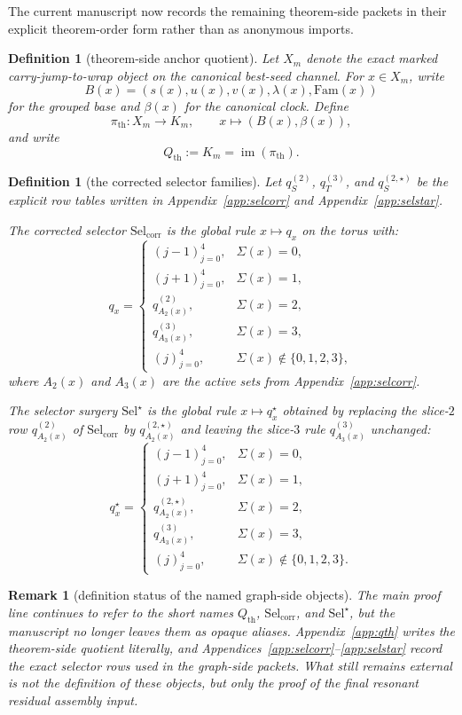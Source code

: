 \documentclass[11pt]{article}
\newtheorem{remark}[theorem]{Remark}
\newtheorem{definition}[theorem]{Definition}
\newcommand{\SelCorr}{\mathrm{Sel}_{\mathrm{corr}}}
\newcommand{\SelStar}{\mathrm{Sel}^{\star}}
\begin{document}
The current manuscript now records the remaining theorem-side packets in their
explicit theorem-order form rather than as anonymous imports.

\begin{definition}[theorem-side anchor quotient]
Let \(X_m\) denote the exact marked carry-jump-to-wrap object on the canonical
best-seed channel.
For \(x\in X_m\), write
\[
B(x)=(s(x),u(x),v(x),\lambda(x),\mathrm{Fam}(x))
\]
for the grouped base and \(\beta(x)\) for the canonical clock.
Define
\[
\pi_{\mathrm{th}}:X_m\to K_m,\qquad x\mapsto(B(x),\beta(x)),
\]
and write
\[
Q_{\mathrm{th}}:=K_m=\operatorname{im}(\pi_{\mathrm{th}}).
\]
\end{definition}

\begin{definition}[the corrected selector families]
Let \(q^{(2)}_S\), \(q^{(3)}_T\), and \(q^{(2,\star)}_S\) be the explicit row
tables written in Appendix~\ref{app:selcorr} and
Appendix~\ref{app:selstar}.

The corrected selector \(\SelCorr\) is the global rule \(x\mapsto q_x\) on the
torus with:
\[
q_x=
\begin{cases}
(j-1)_{j=0}^4, & \Sigma(x)=0,\\
(j+1)_{j=0}^4, & \Sigma(x)=1,\\
q^{(2)}_{A_2(x)}, & \Sigma(x)=2,\\
q^{(3)}_{A_3(x)}, & \Sigma(x)=3,\\
(j)_{j=0}^4, & \Sigma(x)\notin\{0,1,2,3\},
\end{cases}
\]
where \(A_2(x)\) and \(A_3(x)\) are the active sets from
Appendix~\ref{app:selcorr}.

The selector surgery \(\SelStar\) is the global rule \(x\mapsto q_x^\star\)
obtained by replacing the slice-\(2\) row \(q^{(2)}_{A_2(x)}\) of
\(\SelCorr\) by \(q^{(2,\star)}_{A_2(x)}\) and leaving the slice-\(3\) rule
\(q^{(3)}_{A_3(x)}\) unchanged:
\[
q^\star_x=
\begin{cases}
(j-1)_{j=0}^4, & \Sigma(x)=0,\\
(j+1)_{j=0}^4, & \Sigma(x)=1,\\
q^{(2,\star)}_{A_2(x)}, & \Sigma(x)=2,\\
q^{(3)}_{A_3(x)}, & \Sigma(x)=3,\\
(j)_{j=0}^4, & \Sigma(x)\notin\{0,1,2,3\}.
\end{cases}
\]
\end{definition}

\begin{remark}[definition status of the named graph-side objects]
The main proof line continues to refer to the short names
\(Q_{\mathrm{th}}\), \(\SelCorr\), and \(\SelStar\), but the manuscript no
longer leaves them as opaque aliases.
Appendix~\ref{app:qth} writes the theorem-side quotient literally, and
Appendices~\ref{app:selcorr}--\ref{app:selstar} record the exact selector rows
used in the graph-side packets.
What still remains external is not the definition of these objects, but only
the proof of the final resonant residual assembly input.
\end{remark}
\end{document}
